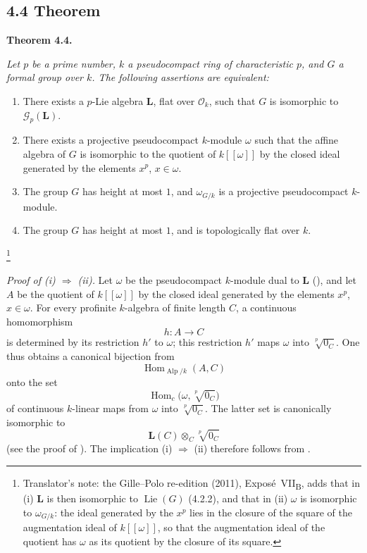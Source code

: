 
\subsection*{4.4 Theorem}
\label{sga3:VIIB:4.4}

\noindent\textbf{Theorem 4.4.}
{\itshape Let \(p\) be a prime number, \(k\) a pseudocompact ring of
characteristic \(p\), and \(G\) a formal group over \(k\). The following
assertions are equivalent:
\begin{enumerate}
\item[\textup{(i)}] There exists a \(p\)-Lie algebra \(\mathbf L\),
flat over \(\mathcal O_k\), such that \(G\) is isomorphic to
\(\mathscr G_p(\mathbf L)\).

\item[\textup{(ii)}] There exists a projective pseudocompact
\(k\)-module \(\omega\) such that the affine algebra of \(G\) is
isomorphic to the quotient of \(k[[\omega]]\) by the closed ideal
generated by the elements \(x^p\), \(x\in\omega\).

\item[\textup{\SGAInlineRefTarget{sga3:viib:subsection:4-4:item:iii}(iii)}] The group \(G\) has height at most \(1\), and
\(\omega_{G/k}\) is a projective pseudocompact \(k\)-module.

\item[\textup{(iv)}] The group \(G\) has height at most \(1\), and
is topologically flat over \(k\).
\end{enumerate}}\footnote{Translator's note: the Gille--Polo re-edition (2011), Expos\'e~VII\textsubscript{B},
adds that in (i) \(\mathbf L\) is then isomorphic to \(\operatorname{Lie}(G)\) (4.2.2), and that in (ii)
\(\omega\) is isomorphic to \(\omega_{G/k}\): the ideal generated by the \(x^p\) lies in the closure of the
square of the augmentation ideal of \(k[[\omega]]\), so that the augmentation ideal of the quotient has
\(\omega\) as its quotient by the closure of its square.}

\noindent\textit{Proof of \textup{(i)} \(\boldsymbol{\Rightarrow}\)
\textup{(ii)}.}
Let \(\omega\) be the pseudocompact \(k\)-module dual to \(\mathbf L\)
\textup{()}, and let \(A\) be the quotient of
\(k[[\omega]]\) by the closed ideal generated by the elements
\(x^p\), \(x\in\omega\). For every profinite \(k\)-algebra of finite
length \(C\), a continuous homomorphism
\[
  h:A\longrightarrow C
\]
is determined by its restriction \(h'\) to \(\omega\); this
restriction \(h'\) maps \(\omega\) into \(\sqrt[p]{0_C}\). One thus
obtains a canonical bijection from
\[
  \operatorname{Hom}_{\operatorname{Alp}/k}(A,C)
\]
onto the set
\[
  \operatorname{Hom}_{c}\bigl(\omega,\sqrt[p]{0_C}\bigr)
\]
of continuous \(k\)-linear maps from \(\omega\) into
\(\sqrt[p]{0_C}\). The latter set is canonically isomorphic to
\[
  \mathbf L(C)\otimes_C\sqrt[p]{0_C}
\]
\textup{(see the proof of )}. The implication
\textup{(i)} \(\Rightarrow\) \textup{(ii)} therefore follows from
.

